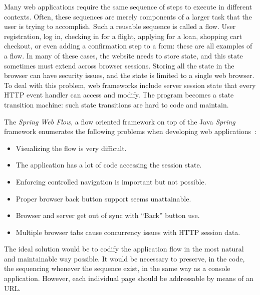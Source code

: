\documentclass{tmr}
\begin{document}
Many web applications require the same sequence of steps to execute in different contexts. Often, these sequences are merely components of a larger task that the user is trying to accomplish. Such a reusable sequence is called a flow. User registration, log in, checking in for a flight, applying for a loan, shopping cart checkout, or even adding a confirmation step to a form: these are all examples of a flow. In many of these cases, the website needs to store state, and this state sometimes must extend across browser sessions. Storing all the state in the browser can have security issues, and the state is limited to a single web browser. To deal with this problem, web frameworks include server session state that every HTTP event handler can access and modify. The program 
becomes a state transition machine: such state transitions are hard to code and maintain. 
 
The \textit{Spring Web Flow}, a flow oriented framework on top of the Java \textit{Spring} framework enumerates the following problems when developing web applications~\cite{auth:spring}: 
 
\begin{itemize} 
\item Visualizing the flow is very difficult. 
\item The application has a lot of code accessing the session state. 
\item Enforcing controlled navigation is important but not possible. 
\item Proper browser back button support seems unattainable. 
\item Browser and server get out of sync with ``Back'' button use. 
\item Multiple browser tabs cause concurrency issues with HTTP session data. 
\end{itemize} 
 
The ideal solution would be to codify the application flow in the most natural and maintainable way possible. It would be necessary to preserve, in the code, the sequencing whenever the sequence exist, in the same way as a console application. However, each individual page should be addressable  by means of an URL\@.
 
\end{document}
